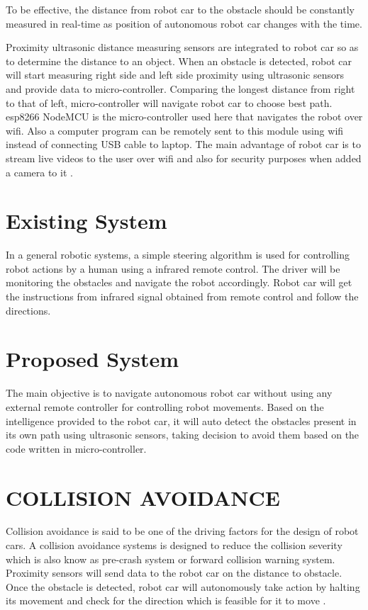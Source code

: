 \documentclass[sigconf]{acmart}
\begin{document}
To be effective, the distance from robot car to the obstacle should be constantly measured in real-time as position of autonomous robot car changes with the time.

Proximity ultrasonic distance measuring sensors are integrated to robot car so as to determine the distance to an object. When an obstacle is detected, robot car will start measuring right side and left side proximity using ultrasonic sensors and provide data to micro-controller. Comparing the longest distance from right to that of left, micro-controller will navigate robot car to choose best path. esp8266 NodeMCU is the micro-controller used here that navigates the robot over wifi. Also a computer program can be remotely sent to this module using wifi instead of connecting USB cable to laptop. The main advantage of robot car is to stream live videos to the user over wifi and also for security purposes when added a camera to it \cite{gregor2017}.

\section{Existing System}
In a general robotic systems, a simple steering algorithm is used for controlling robot actions by a human using a infrared remote control. The driver will be monitoring the obstacles and navigate the robot accordingly. Robot car will get the instructions from infrared signal obtained from remote control and follow the directions.

\section{Proposed System}
The main objective is to navigate autonomous robot car without using any external remote controller for controlling robot movements. Based on the intelligence provided to the robot car, it will auto detect the obstacles present in its own path using ultrasonic sensors, taking decision to avoid them based on the code written in micro-controller.

\section{COLLISION AVOIDANCE}
Collision avoidance is said to be one of the driving factors for the design of robot cars. A collision avoidance systems is designed to reduce the collision severity which is also know as pre-crash system or forward collision warning system. Proximity sensors will send data to the robot car on the distance to obstacle. Once the obstacle is detected, robot  car will autonomously take action by halting its movement and check for the direction which is feasible for it to move \cite{stratis2009}. 
\end{document}
